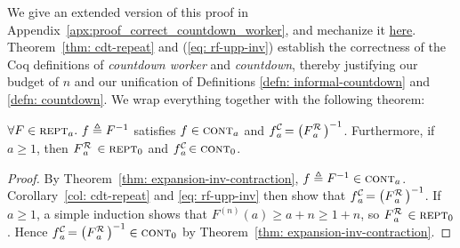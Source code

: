 \noindent We give an extended version of this proof in
Appendix~\ref{apx:proof_correct_countdown_worker},
and mechanize it
\href{https://github.com/inv-ack/inv-ack/blob/7270e64a2600b771f2b1b1b151f7d13fb2ae6c97/countdown.v#L191-L217}{\color{blue}here}.
Theorem~\ref{thm: cdt-repeat} and (\ref{eq: rf-upp-inv}) establish the correctness of the Coq definitions of \emph{countdown worker} and \emph{countdown}, thereby justifying our budget of $n$ and our unification of
Definitions \ref{defn: informal-countdown} and \ref{defn: countdown}. We wrap everything together with the following theorem:
\begin{thm} \label{thm: cdt-inv-rf}
	$\forall F\in \text{\scshape{rept}}_a.~f\triangleq F^{-1}$ satisfies $f \in \text{\scshape{cont}}_{a}$ and $\displaystyle \cdt{f}{a} \ = \left(\rf{F}{a}\ \right)^{-1}$. Furthermore, if $a\ge 1$, then $\rf{F}{a}\ \in \repeatable_0$ and $\cdt{f}{a}\ \in \contract_0$.
\end{thm}
\begin{proof}
	By Theorem~\ref{thm: expansion-inv-contraction}, $f\triangleq F^{-1} \in \text{\scshape{cont}}_a$.
	Corollary~\ref{col: cdt-repeat} and \eqref{eq: rf-upp-inv}
	then show that $\cdt{f}{a}\ = \left(\rf{F}{a}\ \right)^{-1}$.
	If $a\ge 1$, a simple induction shows that $F^{(n)}(a)\ge a + n\ge 1 + n$, so $\rf{F}{a}\ \in \repeatable_0$. Hence $\cdt{f}{a} \ = \left(\rf{F}{a}\ \right)^{-1} \in \contract_0$ by Theorem~\ref{thm: expansion-inv-contraction}.
\end{proof}

